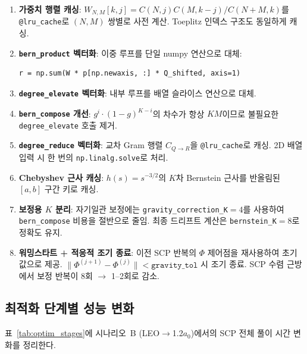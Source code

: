 \documentclass[11pt]{article}
\begin{document}
\begin{enumerate}
  \item \textbf{가중치 행렬 캐싱}:
    $W_{N,M}[k,j] = C(N,j) C(M,k\!-\!j) / C(N\!+\!M,k)$를
    \texttt{@lru\_cache}로 $(N,M)$ 쌍별로 사전 계산.
    Toeplitz 인덱스 구조도 동일하게 캐싱.

  \item \textbf{\texttt{bern\_product} 벡터화}:
    이중 루프를 단일 numpy 연산으로 대체:
\begin{lstlisting}[style=pythonstyle]
r = np.sum(W * p[np.newaxis, :] * Q_shifted, axis=1)
\end{lstlisting}

  \item \textbf{\texttt{degree\_elevate} 벡터화}:
    내부 루프를 배열 슬라이스 연산으로 대체.

  \item \textbf{\texttt{bern\_compose} 개선}:
    $g^i \cdot (1\!-\!g)^{K-i}$의 차수가 항상 $KM$이므로
    불필요한 \texttt{degree\_elevate} 호출 제거.

  \item \textbf{\texttt{degree\_reduce} 벡터화}:
    교차 Gram 행렬 $C_{Q \to R}$을 \texttt{@lru\_cache}로 캐싱.
    2D 배열 입력 시 한 번의 \texttt{np.linalg.solve}로 처리.

  \item \textbf{Chebyshev 근사 캐싱}:
    $h(s) = s^{-3/2}$의 $K$차 Bernstein 근사를
    반올림된 $[a,b]$ 구간 키로 캐싱.

  \item \textbf{보정용 $K$ 분리}:
    자기일관 보정에는 \texttt{gravity\_correction\_K}$=4$를 사용하여
    \texttt{bern\_compose} 비용을 절반으로 줄임.
    최종 드리프트 계산은 \texttt{bernstein\_K}$=8$로 정확도 유지.

  \item \textbf{워밍스타트 + 적응적 조기 종료}:
    이전 SCP 반복의 $\Phi$ 제어점을 재사용하여 초기값으로 제공.
    $\|\Phi^{(j+1)} - \Phi^{(j)}\| < \texttt{gravity\_tol}$ 시 조기 종료.
    SCP 수렴 근방에서 보정 반복이 8회 $\to$ 1--2회로 감소.
\end{enumerate}

\subsection{최적화 단계별 성능 변화}

표~\ref{tab:optim_stages}에 시나리오~B (LEO$\to$1.2$a_0$)에서의
SCP 전체 풀이 시간 변화를 정리한다.
\end{document}
